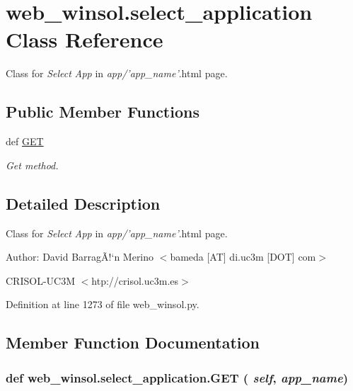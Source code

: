 \hypertarget{classweb__winsol_1_1select__application}{
\section{web\_\-winsol.select\_\-application Class Reference}
\label{classweb__winsol_1_1select__application}
}
Class for {\em Select\/} {\em App\/} in {\em app/'app\_\-name'\/}.html page.  


\subsection*{Public Member Functions}
\begin{CompactItemize}
\item 
def \hyperlink{classweb__winsol_1_1select__application_c966e38c7af17e6c4e2e922baa28efdd}{GET}
\begin{CompactList}\small\item\em Get method. \item\end{CompactList}\end{CompactItemize}


\subsection{Detailed Description}
Class for {\em Select\/} {\em App\/} in {\em app/'app\_\-name'\/}.html page. 

\begin{Desc}
\item[Author:]David Barrag\~{A}!`n Merino $<$bameda \mbox{[}AT\mbox{]} di.uc3m \mbox{[}DOT\mbox{]} com$>$ 

CRISOL-UC3M $<$htp://crisol.uc3m.es$>$ \end{Desc}




Definition at line 1273 of file web\_\-winsol.py.

\subsection{Member Function Documentation}
\hypertarget{classweb__winsol_1_1select__application_c966e38c7af17e6c4e2e922baa28efdd}{
\subsubsection[GET]{\setlength{\rightskip}{0pt plus 5cm}def web\_\-winsol.select\_\-application.GET ( {\em self},  {\em app\_\-name})}}
\label{classweb__winsol_1_1select__application_c966e38c7af17e6c4e2e922baa28efdd}


